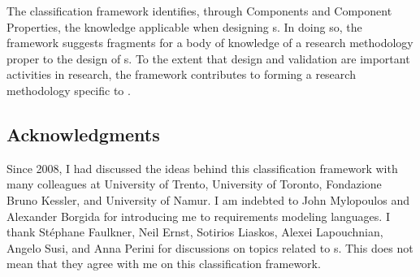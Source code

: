 \documentclass[10pt, final, conference, compsocconf]{IEEEtran}
\begin{document}
The classification framework identifies, through Components and Component Properties, the knowledge applicable when designing s. In doing so, the framework suggests fragments for a body of knowledge of a research methodology proper to the design of s. To the extent that  design and validation are important activities in  research, the framework contributes to forming a research methodology specific to .


\subsection*{Acknowledgments}

Since 2008, I had discussed the ideas behind this classification framework with many colleagues at University of Trento, University of Toronto, Fondazione Bruno Kessler, and University of Namur. I am indebted to John Mylopoulos and Alexander Borgida for introducing me to requirements modeling languages. I thank St\'{e}phane Faulkner, Neil Ernst, Sotirios Liaskos, Alexei Lapouchnian, Angelo Susi, and Anna Perini for discussions on topics related to s. This does not mean that they agree with me on this classification framework.




\end{document}
